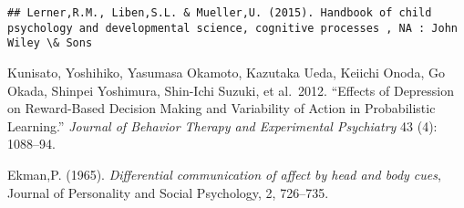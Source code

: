 \documentclass[11pt,a4paper,xelatex,ja=standard]{bxjsarticle}
\begin{document}
\begin{verbatim}
## Lerner,R.M., Liben,S.L. & Mueller,U. (2015). Handbook of child psychology and developmental science, cognitive processes , NA : John Wiley \& Sons
\end{verbatim}

\hypertarget{refs}{}
\leavevmode\hypertarget{ref-Kunisato2012}{}

Kunisato, Yoshihiko, Yasumasa Okamoto, Kazutaka Ueda, Keiichi Onoda, Go
Okada, Shinpei Yoshimura, Shin-Ichi Suzuki, et al.~2012. ``Effects of
Depression on Reward-Based Decision Making and Variability of Action in
Probabilistic Learning.'' \emph{Journal of Behavior Therapy and
Experimental Psychiatry} 43 (4): 1088--94.

Ekman,P. (1965).
\emph{ Differential communication of affect by head and body cues},
Journal of Personality and Social Psychology, 2, 726--735.
\end{document}

